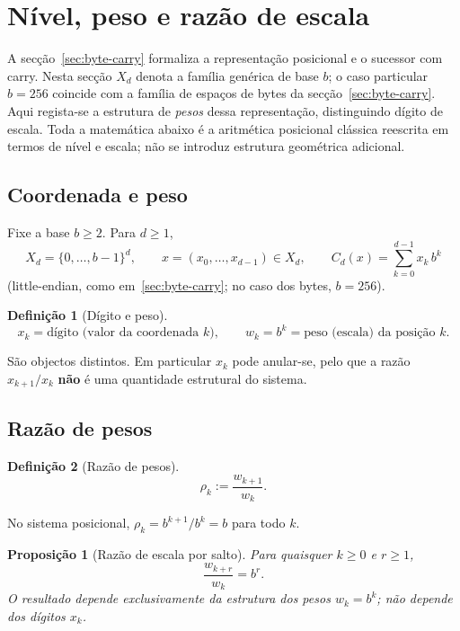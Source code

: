 \documentclass[11pt,a4paper]{article}
\newtheorem{definicao}{Definição}
\newtheorem{proposicao}{Proposição}
\begin{document}
\section{Nível, peso e razão de escala}
\label{sec:nivel-peso-escala}

A secção~\ref{sec:byte-carry} formaliza a representação posicional e o sucessor com carry. Nesta secção \(X_d\) denota a família genérica de base \(b\); o caso particular \(b=256\) coincide com a família de espaços de bytes da secção~\ref{sec:byte-carry}. Aqui regista-se a estrutura de \emph{pesos} dessa representação, distinguindo dígito de escala. Toda a matemática abaixo é a aritmética posicional clássica reescrita em termos de nível e escala; não se introduz estrutura geométrica adicional.

\subsection{Coordenada e peso}

Fixe a base \(b\ge 2\). Para \(d\ge 1\),
\[
X_d=\{0,\dots,b-1\}^d,\qquad
x=(x_0,\dots,x_{d-1})\in X_d,
\qquad
C_d(x)=\sum_{k=0}^{d-1}x_k\,b^k
\]
(little-endian, como em~\ref{sec:byte-carry}; no caso dos bytes, \(b=256\)).

\begin{definicao}[Dígito e peso]
\label{def:peso}
\[
x_k=\text{dígito (valor da coordenada }k),\qquad
w_k=b^k=\text{peso (escala) da posição }k.
\]
\end{definicao}

São objectos distintos. Em particular \(x_k\) pode anular-se, pelo que a razão \(x_{k+1}/x_k\) \textbf{não} é uma quantidade estrutural do sistema.

\subsection{Razão de pesos}

\begin{definicao}[Razão de pesos]
\label{def:rho}
\[
\rho_k:=\frac{w_{k+1}}{w_k}.
\]
\end{definicao}

No sistema posicional, \(\rho_k=b^{k+1}/b^k=b\) para todo \(k\).

\begin{proposicao}[Razão de escala por salto]
\label{prop:razao-escala}
Para quaisquer \(k\ge 0\) e \(r\ge 1\),
\[
\boxed{\frac{w_{k+r}}{w_k}=b^r}.
\]
O resultado depende exclusivamente da estrutura dos pesos \(w_k=b^k\); não depende dos dígitos \(x_k\).
\end{proposicao}
\end{document}
